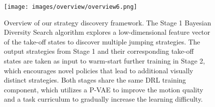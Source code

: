 \begin{figure}[t]
    \centering
    \texttt{[image: images/overview/overview6.png]}
    \caption{{Overview of our strategy discovery framework. The Stage 1 Bayesian Diversity Search algorithm explores a low-dimensional feature vector of the take-off states to discover multiple jumping strategies. The output strategies from Stage 1 and their corresponding take-off states are taken as input to warm-start further training in Stage 2, which encourages novel policies that lead to additional visually distinct strategies. Both stages share the same DRL training component, which utilizes a P-VAE to improve the motion quality and a task curriculum to gradually increase the learning difficulty.}}
    \label{fig:overview}
\end{figure}
